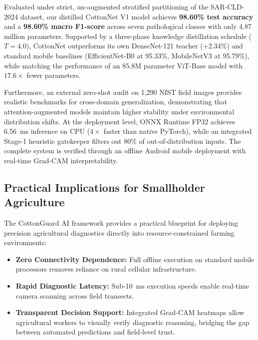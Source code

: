 \documentclass[journal,10pt,twocolumn]{IEEEtran}
\begin{document}
Evaluated under strict, un-augmented stratified partitioning of the SAR-CLD-2024 dataset, our distilled CottonNet V1 model achieves \textbf{98.60\% test accuracy} and a \textbf{98.60\% macro F1-score} across seven pathological classes with only 4.87 million parameters. Supported by a three-phase knowledge distillation schedule ($T=4.0$), CottonNet outperforms its own DenseNet-121 teacher (+2.34\%) and standard mobile baselines (EfficientNet-B0 at 95.33\%, MobileNetV3 at 95.79\%), while matching the performance of an 85.8M parameter ViT-Base model with $17.6\times$ fewer parameters.

Furthermore, an external zero-shot audit on 1,290 NIST field images provides realistic benchmarks for cross-domain generalization, demonstrating that attention-augmented models maintain higher stability under environmental distribution shifts. At the deployment level, ONNX Runtime FP32 achieves 6.56~ms inference on CPU ($4\times$ faster than native PyTorch), while an integrated Stage-1 heuristic gatekeeper filters out 80\% of out-of-distribution inputs. The complete system is verified through an offline Android mobile deployment with real-time Grad-CAM interpretability.

\subsection{Practical Implications for Smallholder Agriculture}
The CottonGuard AI framework provides a practical blueprint for deploying precision agricultural diagnostics directly into resource-constrained farming environments:
\begin{itemize}[leftmargin=*]
    \item \textbf{Zero Connectivity Dependence:} Full offline execution on standard mobile processors removes reliance on rural cellular infrastructure.
    \item \textbf{Rapid Diagnostic Latency:} Sub-10~ms execution speeds enable real-time camera scanning across field transects.
    \item \textbf{Transparent Decision Support:} Integrated Grad-CAM heatmaps allow agricultural workers to visually verify diagnostic reasoning, bridging the gap between automated predictions and field-level trust.
\end{itemize}
\end{document}
